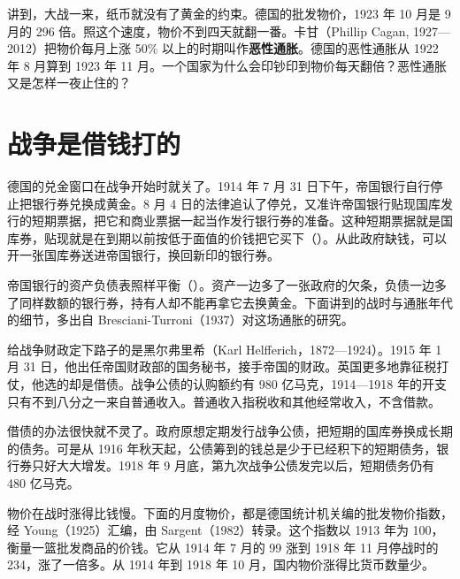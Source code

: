 讲到，大战一来，纸币就没有了黄金的约束。德国的批发物价，1923 年 10 月是 9 月的 296 倍\cite{sargent1982}。照这个速度，物价不到四天就翻一番。卡甘（Phillip Cagan, 1927—2012）把物价每月上涨 50\% 以上的时期叫作\textbf{恶性通胀}\cite{cagan1956,fischer2002}。德国的恶性通胀从 1922 年 8 月算到 1923 年 11 月\cite{fischer2002}。一个国家为什么会印钞印到物价每天翻倍？恶性通胀又是怎样一夜止住的？

\section{战争是借钱打的}\label{sec:weimar-world}

德国的兑金窗口在战争开始时就关了。1914 年 7 月 31 日下午，帝国银行自行停止把银行券兑换成黄金。8 月 4 日的法律追认了停兑，又准许帝国银行贴现国库发行的短期票据，把它和商业票据一起当作发行银行券的准备\cite{bresciani1937}。这种短期票据就是国库券，贴现就是在到期以前按低于面值的价钱把它买下（）。从此政府缺钱，可以开一张国库券送进帝国银行，换回新印的银行券。

帝国银行的资产负债表照样平衡（）。资产一边多了一张政府的欠条，负债一边多了同样数额的银行券，持有人却不能再拿它去换黄金。下面讲到的战时与通胀年代的细节，多出自 Bresciani-Turroni（1937）对这场通胀的研究\cite{bresciani1937}。

给战争财政定下路子的是黑尔弗里希（Karl Helfferich，1872—1924）。1915 年 1 月 31 日，他出任帝国财政部的国务秘书，接手帝国的财政。英国更多地靠征税打仗，他选的却是借债\cite{helfferich1969}。战争公债的认购额约有 980 亿马克，1914—1918 年的开支只有不到八分之一来自普通收入\cite{bresciani1937}。普通收入指税收和其他经常收入，不含借款。

借债的办法很快就不灵了。政府原想定期发行战争公债，把短期的国库券换成长期的债务。可是从 1916 年秋天起，公债筹到的钱总是少于已经积下的短期债务，银行券只好大大增发\cite{bresciani1937,helfferich1969}。1918 年 9 月底，第九次战争公债发完以后，短期债务仍有 480 亿马克\cite{bresciani1937}。

物价在战时涨得比钱慢。下面的月度物价，都是德国统计机关编的批发物价指数，经 Young（1925）汇编，由 Sargent（1982）转录\cite{sargent1982}。这个指数以 1913 年为 100，衡量一篮批发商品的价钱。它从 1914 年 7 月的 99 涨到 1918 年 11 月停战时的 234，涨了一倍多。从 1914 年到 1918 年 10 月，国内物价涨得比货币数量少\cite{bresciani1937}。

